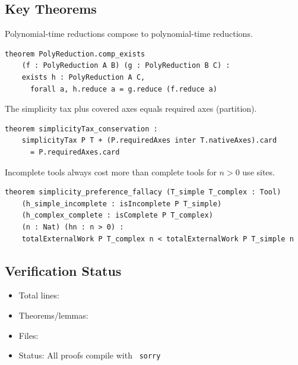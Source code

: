 \subsection{Key Theorems}

\begin{theorem}\label{thm:poly-compose}
Polynomial-time reductions compose to polynomial-time reductions.
\end{theorem}

\begin{verbatim}
theorem PolyReduction.comp_exists
    (f : PolyReduction A B) (g : PolyReduction B C) :
    exists h : PolyReduction A C,
      forall a, h.reduce a = g.reduce (f.reduce a)
\end{verbatim}

\begin{theorem}\label{thm:tax-conservation-lean}
The simplicity tax plus covered axes equals required axes (partition).
\end{theorem}

\begin{verbatim}
theorem simplicityTax_conservation :
    simplicityTax P T + (P.requiredAxes inter T.nativeAxes).card
      = P.requiredAxes.card
\end{verbatim}

\begin{theorem}\label{thm:fallacy-lean}
Incomplete tools always cost more than complete tools for $n > 0$ use sites.
\end{theorem}

\begin{verbatim}
theorem simplicity_preference_fallacy (T_simple T_complex : Tool)
    (h_simple_incomplete : isIncomplete P T_simple)
    (h_complex_complete : isComplete P T_complex)
    (n : Nat) (hn : n > 0) :
    totalExternalWork P T_complex n < totalExternalWork P T_simple n
\end{verbatim}

\subsection{Verification Status}

\begin{itemize}
\item Total lines: \LeanTotalLines
\item Theorems/lemmas: \LeanTotalTheorems
\item Files: \LeanTotalFiles
\item Status: All proofs compile with \LeanTotalSorry\ \texttt{sorry}
\end{itemize}
